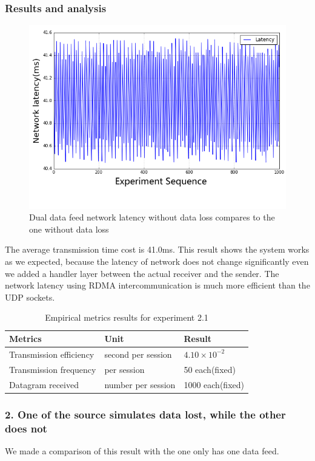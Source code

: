 \documentclass[11pt,openright,a4paper]{report}
\begin{document}
\subsubsection{Results and analysis}
\begin{figure}[H]
\centering
\includegraphics[width=0.7\linewidth]{picture/experiments/exp2/dualLatency}
\caption{Dual data feed network latency without data loss compares to the one without data loss}
\label{fig:dualLatency}
\end{figure}
The average transmission time cost is 41.0ms. This result shows the system works as we expected, because the latency of network does not change significantly even we added a handler layer between the actual receiver and the sender. The network latency using RDMA intercommunication is much more efficient than the UDP sockets.\\ 
\begin{table}[H]
	\centering
	\caption{Empirical metrics results for experiment 2.1}
	\label{my-label}
	\begin{tabular}{@{}lll@{}}
		\toprule
		Metrics                 & Unit               & Result                 \\ \midrule
		Transmission efficiency & second per session & $4.10\times 10^{-2}$ \\
		Transmission frequency  & per session        & 50 each(fixed)              \\
		Datagram received       & number per session & 1000 each(fixed)            \\ \bottomrule
	\end{tabular}
\end{table}
\subsubsection{2. One of the source simulates data lost, while the other does not}
We made a comparison of this result with the one only has one data feed. 
\end{document}

